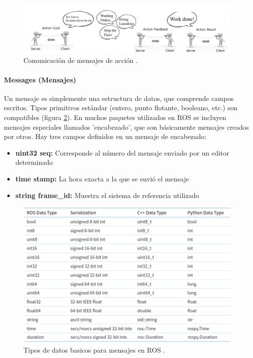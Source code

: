            \begin{figure}[htb]
                \centering
                \includegraphics[width=1.0\linewidth]{Main/Chapter3/Images3/n_s_a_12.png}
                \caption{Comunicación de mensajes de acción \cite{ROS_BOOK_1}.}
                \label{f:Cap3_conceptos_12}
            \end{figure}   

               \newpage

            \paragraph{Messages (Mensajes)}
                Un mensaje es simplemente una estructura de datos, que comprende campos escritos. Tipos primitivos estándar (entero, punto flotante, booleano, etc.) son compatibles (figura \ref{f:Cap3_conceptos_13}). En muchos paquetes utilizados en ROS se incluyen mensajes especiales llamados 'encabezado', que son básicamente mensajes creados por otros. Hay tres campos definidos en un mensaje de encabezado: 
                
                \begin{itemize}
                    \item {\textbf{uint32 seq:} Corresponde al número del mensaje enviado por un editor determinado}
                    \item {\textbf{time stamp: } La hora exacta a la que se envió el mensaje}
                    \item {\textbf{string frame\_id:} Muestra el sistema de referencia utilizado}
                \end{itemize}

            \begin{figure}[htb]
                \centering
                \includegraphics[width=1.0\linewidth]{Main/Chapter3/Images3/n_s_a_13.png}
                \caption{Tipos de datos basicos para mensajes en ROS \cite{ROS_BOOK_1}.}
                \label{f:Cap3_conceptos_13}
            \end{figure}   

